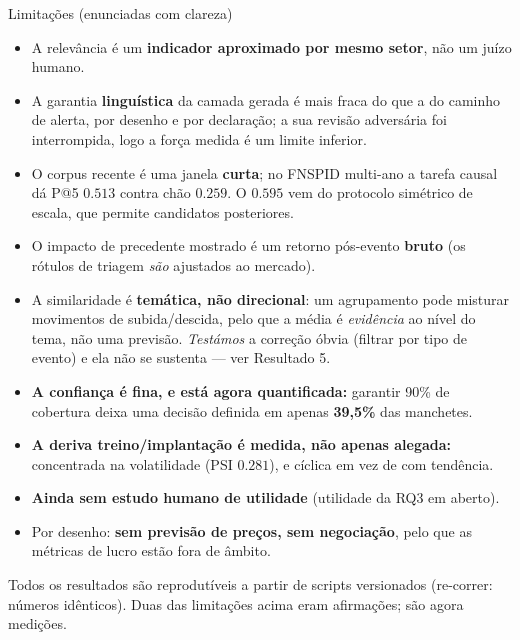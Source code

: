 \documentclass[aspectratio=169]{beamer}
\begin{document}
\begin{frame}{Limitações (enunciadas com clareza)}
\begin{itemize}
  \item A relevância é um \textbf{indicador aproximado por mesmo setor}, não um juízo humano.
  \item A garantia \textbf{linguística} da camada gerada é mais fraca do que a do caminho de alerta, por desenho e por declaração; a sua revisão adversária foi interrompida, logo a força medida é um limite inferior.
  \item O corpus recente é uma janela \textbf{curta}; no FNSPID multi-ano a tarefa causal dá P@5 $0.513$ contra chão $0.259$. O $0.595$ vem do protocolo simétrico de escala, que permite candidatos posteriores.
  \item O impacto de precedente mostrado é um retorno pós-evento \textbf{bruto} (os rótulos de triagem \emph{são} ajustados ao mercado).
  \item A similaridade é \textbf{temática, não direcional}: um agrupamento pode misturar movimentos de subida/descida, pelo que a média é \emph{evidência} ao nível do tema, não uma previsão. \emph{Testámos} a correção óbvia (filtrar por tipo de evento) e ela não se sustenta --- ver Resultado 5.
  \item \textbf{A confiança é fina, e está agora quantificada:} garantir 90\% de cobertura deixa uma decisão definida em apenas \textbf{39,5\%} das manchetes.
  \item \textbf{A deriva treino/implantação é medida, não apenas alegada:} concentrada na volatilidade (PSI $0.281$), e cíclica em vez de com tendência.
  \item \textbf{Ainda sem estudo humano de utilidade} (utilidade da RQ3 em aberto).
  \item Por desenho: \textbf{sem previsão de preços, sem negociação}, pelo que as métricas de lucro estão fora de âmbito.
\end{itemize}
\vfill
\footnotesize Todos os resultados são reprodutíveis a partir de scripts versionados (re-correr: números idênticos).
Duas das limitações acima eram afirmações; são agora medições.
\end{frame}
\end{document}
